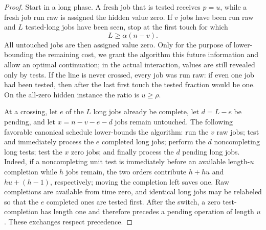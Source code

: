 \begin{proof}
Start in a long phase.  A fresh job that is tested receives $p=u$, while a
fresh job run raw is assigned the hidden value zero.  If $v$ jobs have been
run raw and $L$ tested-long jobs have been seen, stop at the first touch for
which
\begin{equation}
 L\ge\alpha(n-v).
 \label{eq:opt:stopping-line}
\end{equation}
All untouched jobs are then assigned value zero.  Only for the purpose of
lower-bounding the remaining cost, we grant the algorithm this future
information and allow an optimal continuation; in the actual interaction,
values are still revealed only by tests.  If the line is never crossed, every job
was run raw: if even one job had been tested, then after the last first touch
the tested fraction would be one.  On the all-zero hidden instance the ratio
is $u\ge\rho$.

At a crossing, let $e$ of the $L$ long jobs already be complete, let $d=L-e$
be pending, and let $x=n-v-e-d$ jobs remain untouched.  The following
favorable canonical schedule lower-bounds the algorithm: run the $v$ raw
jobs; test and immediately process the $e$ completed long jobs; perform the
$d$ noncompleting long tests; test the $x$ zero jobs; and finally process the
$d$ pending long jobs.  Indeed, if a noncompleting unit test is immediately
before an available length-$u$ completion while $h$ jobs remain, the two
orders contribute $h+hu$ and $hu+(h-1)$, respectively; moving the
completion left saves one.  Raw completions are available from time zero,
and identical long jobs may be relabeled so that the $e$ completed ones are
tested first.  After the switch, a zero test-completion has length one and
therefore precedes a pending operation of length $u$.  These exchanges
respect precedence.


\end{proof}
